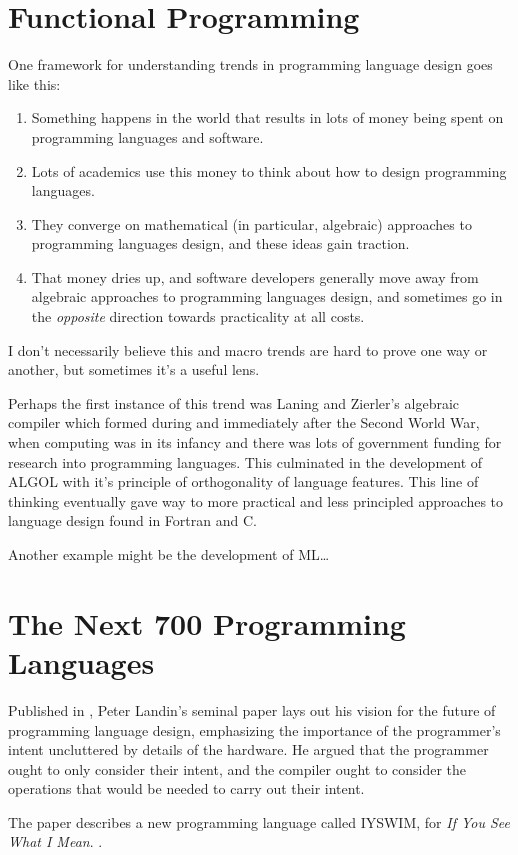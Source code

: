 \section{Functional Programming}

One framework for understanding trends in programming language design
goes like this:

\begin{enumerate}
	\item Something happens in the world that results in lots of money being spent on
	      programming languages and software.
	\item Lots of academics use this money to think about how to design programming languages.
	\item They converge on mathematical (in particular, algebraic)
	      approaches to programming languages design,
	      and these ideas gain traction.
	\item That money dries up, and software developers generally move
	      away from algebraic approaches to programming languages design,
	      and sometimes go in the \textit{opposite} direction towards
	      practicality at all costs.
\end{enumerate}

I don't necessarily believe this and macro trends are hard to prove one
way or another, but sometimes it's a useful lens.

Perhaps the first instance of this trend was Laning and Zierler's algebraic compiler
which formed during and immediately after the Second World War, when computing was
in its infancy and there was lots of government funding for research into programming languages.
This culminated in the development of ALGOL with it's principle of orthogonality of language
features.
This line of thinking eventually gave way to more practical and less principled approaches to
language design found in Fortran and C.

Another example might be the development of ML\dots {}

\section{The Next 700 Programming Languages}

Published in \citeyear{landin_next_700_prog_langs_1966},
Peter Landin's seminal paper  lays out his vision for
the future of programming language design, emphasizing the importance of the programmer's intent
uncluttered by details of the hardware.
He argued that the programmer ought to only consider their intent, and the compiler ought to
consider the operations that would be needed to carry out their intent.

The paper describes a new programming language called IYSWIM, for \textit{If You See What I Mean}.
.
